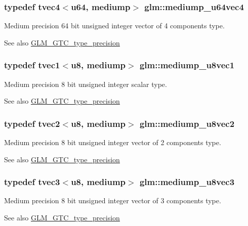 \subsubsection[{mediump\+\_\+u64vec4}]{\setlength{\rightskip}{0pt plus 5cm}typedef tvec4$<${\bf u64}, mediump$>$ {\bf glm\+::mediump\+\_\+u64vec4}}\label{namespaceglm_aab6577efa0c0450dc008f7ac27b94373}
Medium precision 64 bit unsigned integer vector of 4 components type. \begin{DoxySeeAlso}{See also}
\hyperlink{group__gtc__type__precision}{G\+L\+M\+\_\+\+G\+T\+C\+\_\+type\+\_\+precision} 
\end{DoxySeeAlso}
\hypertarget{namespaceglm_aa03de8f939e9f1292ef43fe5dbfcbbfb}{}
\subsubsection[{mediump\+\_\+u8vec1}]{\setlength{\rightskip}{0pt plus 5cm}typedef tvec1$<${\bf u8}, mediump$>$ {\bf glm\+::mediump\+\_\+u8vec1}}\label{namespaceglm_aa03de8f939e9f1292ef43fe5dbfcbbfb}
Medium precision 8 bit unsigned integer scalar type. \begin{DoxySeeAlso}{See also}
\hyperlink{group__gtc__type__precision}{G\+L\+M\+\_\+\+G\+T\+C\+\_\+type\+\_\+precision} 
\end{DoxySeeAlso}
\hypertarget{namespaceglm_a57c53a29ee903a4f472596d44b5b2329}{}
\subsubsection[{mediump\+\_\+u8vec2}]{\setlength{\rightskip}{0pt plus 5cm}typedef tvec2$<${\bf u8}, mediump$>$ {\bf glm\+::mediump\+\_\+u8vec2}}\label{namespaceglm_a57c53a29ee903a4f472596d44b5b2329}
Medium precision 8 bit unsigned integer vector of 2 components type. \begin{DoxySeeAlso}{See also}
\hyperlink{group__gtc__type__precision}{G\+L\+M\+\_\+\+G\+T\+C\+\_\+type\+\_\+precision} 
\end{DoxySeeAlso}
\hypertarget{namespaceglm_a10e59f2fda069e95dae490e1a08879f8}{}
\subsubsection[{mediump\+\_\+u8vec3}]{\setlength{\rightskip}{0pt plus 5cm}typedef tvec3$<${\bf u8}, mediump$>$ {\bf glm\+::mediump\+\_\+u8vec3}}\label{namespaceglm_a10e59f2fda069e95dae490e1a08879f8}
Medium precision 8 bit unsigned integer vector of 3 components type. \begin{DoxySeeAlso}{See also}
\hyperlink{group__gtc__type__precision}{G\+L\+M\+\_\+\+G\+T\+C\+\_\+type\+\_\+precision} 
\end{DoxySeeAlso}
\hypertarget{namespaceglm_a7f5ea1d9cc541f389e1dc8e322a7c2e6}{}
